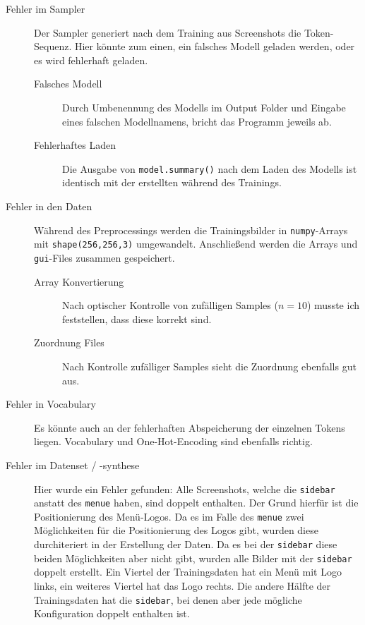 \documentclass[pdftex,a4paper,halfparskip, article]{scrartcl}
\begin{document}
\begin{description}
	\item[Fehler im Sampler] Der Sampler generiert nach dem Training aus Screenshots die Token-Sequenz. Hier könnte zum einen, ein falsches Modell geladen werden, oder es wird fehlerhaft geladen.
	
	\begin{description}
		\item[Falsches Modell] Durch Umbenennung des Modells im Output Folder und Eingabe eines falschen Modellnamens, bricht das Programm jeweils ab.
		\item[Fehlerhaftes Laden] Die Ausgabe von \texttt{model.summary()} nach dem Laden des Modells ist identisch mit der erstellten während des Trainings.
	\end{description}
	
	\item[Fehler in den Daten] Während des Preprocessings werden die Trainingsbilder in \texttt{numpy}-Arrays mit \texttt{shape(256,256,3)} umgewandelt. Anschließend werden die Arrays und \texttt{gui}-Files zusammen gespeichert.
	
	\begin{description}
		\item[Array Konvertierung] Nach optischer Kontrolle von zufälligen Samples ($n=10$) musste ich feststellen, dass diese korrekt sind.
		\item[Zuordnung Files] Nach Kontrolle zufälliger Samples sieht die Zuordnung ebenfalls gut aus.
	\end{description}
	
	\item[Fehler in Vocabulary] Es könnte auch an der fehlerhaften Abspeicherung der einzelnen Tokens liegen. Vocabulary und One-Hot-Encoding sind ebenfalls richtig.
	
	\item[Fehler im Datenset / -synthese] Hier wurde ein Fehler gefunden: Alle Screenshots, welche die \texttt{sidebar} anstatt des \texttt{menue} haben, sind doppelt enthalten. Der Grund hierfür ist die Positionierung des Menü-Logos. Da es im Falle des \texttt{menue} zwei Möglichkeiten für die Positionierung des Logos gibt, wurden diese durchiteriert in der Erstellung der Daten. Da es bei der \texttt{sidebar} diese beiden Möglichkeiten aber nicht gibt, wurden alle Bilder mit der \texttt{sidebar} doppelt erstellt. Ein Viertel der Trainingsdaten hat ein Menü mit Logo links, ein weiteres Viertel hat das Logo rechts. Die andere Hälfte der Trainingsdaten hat die \texttt{sidebar}, bei denen aber jede mögliche Konfiguration doppelt enthalten ist.
	
\end{description}
\end{document}
